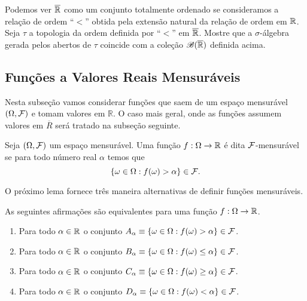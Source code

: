 \begin{exercicio}
	Podemos ver $\overline{\mathbb{R}}$ como um conjunto totalmente ordenado se 
	consideramos a relação de ordem ``$<$'' obtida pela extensão natural 
	da relação de ordem em $\mathbb{R}$.
	Seja $\tau$ a topologia da ordem definida por ``$<$'' 
	em $\overline{\mathbb{R}}$. Mostre que a $\sigma$-álgebra gerada pelos 
	abertos de $\tau$ coincide com a coleção $\mathscr{B}(\overline{\mathbb{R}})$
	definida acima. 
	
\end{exercicio}










\subsection*{Funções a Valores Reais Mensuráveis}

Nesta subseção vamos considerar funções que
saem de um espaço mensurável $(\Omega,\mathcal{F})$ e tomam 
valores em $\mathbb{R}$. O caso mais geral, onde
as funções assumem valores em $\overline{R}$ será
tratado na subseção seguinte.


\begin{definicao} 
Seja $(\Omega,\mathcal{F})$ um espaço mensurável. 
Uma função $f:\Omega\to\mathbb{R}$ é dita $\mathcal{F}$-mensurável
se para todo número real $\alpha$ temos que
\[
	\{\omega \in\Omega : f(\omega)>\alpha \} \in \mathcal{F}.
\]
\end{definicao}

O próximo lema fornece três maneira alternativas de
definir funções mensuráveis. 

\begin{lema}
As seguintes afirmações são equivalentes para uma função 
$f:\Omega\to\mathbb{R}$.
\begin{enumerate}
	\item 
	Para todo $\alpha\in\mathbb{R}$ o conjunto 
	$A_{\alpha}\equiv\{\omega\in\Omega : f(\omega)>\alpha \} \in \mathcal{F}$.

	\item 
	Para todo $\alpha\in\mathbb{R}$ o conjunto 
	$B_{\alpha}\equiv\{\omega\in\Omega : f(\omega)\leq \alpha \} \in \mathcal{F}$.

	\item 
	Para todo $\alpha\in\mathbb{R}$ o conjunto 
	$C_{\alpha}\equiv\{\omega\in\Omega : f(\omega)\geq\alpha \} \in \mathcal{F}$.

	\item 
	Para todo $\alpha\in\mathbb{R}$ o conjunto 
	$D_{\alpha}\equiv\{\omega\in\Omega : f(\omega)<\alpha \} \in \mathcal{F}$.
	
\end{enumerate}
\end{lema}


